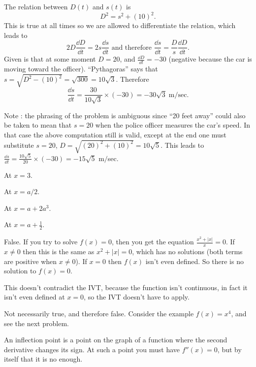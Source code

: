 The relation between $D(t)$ and $s(t)$ is
\[
D^2 = s^2 + (10)^2.
\]
This is true at all times so we are allowed to differentiate the relation,
which leads to
\[
2D \frac{\dd D} {\dd t} = 2s\frac{\dd s} {\dd t}
\text{ and therefore }
\frac{\dd s} {\dd t} = \frac{D} {s} \frac{\dd D} {\dd t}.
\]
Given is that at some moment $D=20$, and $\frac{\dd D} {\dd t} = -30$
(negative because the car is moving toward the officer).
``Pythagoras'' says that $s = \sqrt{D^2-(10)^2} = \sqrt{300} = 10\surd 3$.
Therefore
\[
\frac{\dd s} {\dd t} = \frac{30} {10\surd 3} \times(-30) =
-30\surd 3\; \mathrm{m}/\mathrm{sec}.
\]

Note : the phrasing of the problem is ambiguous since ``20 feet away'' could
also be taken to mean that $s=20$ when the police officer measures the car's
speed. In that case the above computation still is valid, except at the end
one must substitute $s=20$, $D = \sqrt{(20)^2 + (10)^2} = 10\surd 5$.
This leads to
$\frac{\dd s} {\dd t} = \frac{10\surd 5} {20}\times(-30) = -15\surd 5$ m$/$sec.
\bigskip

\item[{\bfseries(V3.1)}]
At $x=3$.
\bigskip

\item[{\bfseries(V3.2)}]
At $x=a/2$.
\bigskip

\item[{\bfseries(V3.3)}]
At $x=a+2a^3$.
\bigskip

\item[{\bfseries(V3.5)}]
At $x=a+\frac12$.
\bigskip

\item[{\bfseries(V3.11)}]
False.  If you try to solve $f(x) = 0$, then you get the equation
$\frac{x^2+|x|}{x}=0$.  If $x\ne0$ then this is the same as
$x^2+|x|=0$, which has no solutions (both terms are positive when
$x\ne0$).  If $x=0$ then $f(x)$ isn't even defined.
So there is no solution to $f(x) = 0$.




This doesn't contradict the IVT, because the function isn't
continuous, in fact it isn't even defined at $x=0$, so the IVT
doesn't have to apply.
\bigskip

\item[{\bfseries(V12.6)}]
Not necessarily true, and therefore false.  Consider the example
$f(x)=x^4$, and see the next problem.
\bigskip

\item[{\bfseries(V12.7)}]
An inflection point is a point on the graph of a function where the
second derivative changes its sign.  At such a point you must have
$f''(x) = 0$, but by itself that it is no enough.
\bigskip

